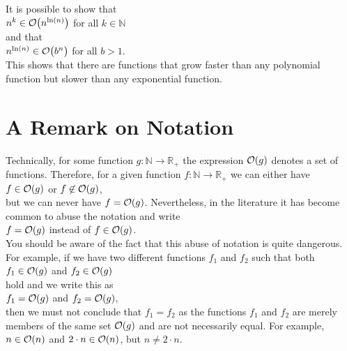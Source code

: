 \remark      
It is possible to show that
\\[0.2cm]
\hspace*{1.3cm}
$n^k \in \mathcal{O}\bigl(n^{\ln(n)}\bigr)$ \quad for all $k \in \mathbb{N}$
\\
and that
\\
\hspace*{1.3cm}
$n^{\ln(n)} \in \mathcal{O}\bigl(b^n\bigr)$ \quad for all $b > 1$.  
\\[0.2cm]
This shows that there are functions that grow faster than any polynomial
function but slower than any exponential function. \eox


\section{A Remark on Notation}
Technically, for some function $g:\mathbb{N} \rightarrow \mathbb{R}_+$ the expression $\mathcal{O}(g)$
denotes a set of functions.  Therefore, for a given function $f:\mathbb{N} \rightarrow \mathbb{R}_+$ we can
either have
\\[0.2cm]
\hspace*{1.3cm}
$f \in \mathcal{O}(g)$ \quad or \quad $f \not\in \mathcal{O}(g)$,
\\[0.2cm]
but we can never have $f = \mathcal{O}(g)$.  Nevertheless, in the literature it has become common to abuse the
notation and write
\\[0.2cm]
\hspace*{1.3cm}
$f = \mathcal{O}(g)$ \quad instead of \quad $f \in \mathcal{O}(g)$.
\\[0.2cm]
You should be aware of the fact that
this abuse of notation is quite dangerous.  For example, if we have two different functions $f_1$ and
$f_2$ such that both
\\[0.2cm]
\hspace*{1.3cm}
$f_1 \in \mathcal{O}(g)$ \quad and \quad $f_2 \in \mathcal{O}(g)$
\\[0.2cm]
hold and we write this as
\\[0.2cm]
\hspace*{1.3cm}
$f_1 = \mathcal{O}(g)$ \quad and \quad $f_2 = \mathcal{O}(g)$,
\\[0.2cm]
then we must not conclude that $f_1 = f_2$ as the functions $f_1$ and $f_2$ are merely members of
the same set $\mathcal{O}(g)$ and are not necessarily equal.  For example, $n \in \mathcal{O}(n)$ and 
$2 \cdot n \in \mathcal{O}(n)$,  but $n \not= 2 \cdot n$.

